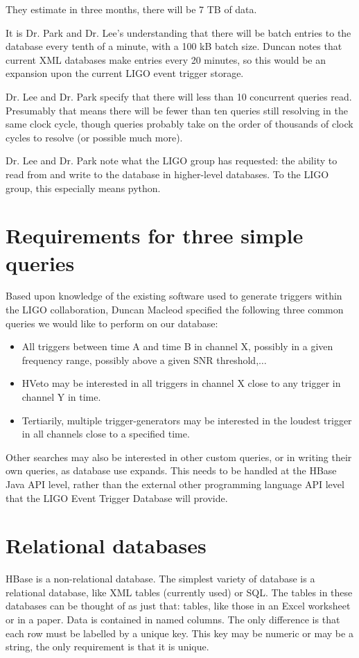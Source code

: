 \documentclass{article}
\begin{document}
They estimate in three months, there will be 7 TB of data.

It is Dr. Park and Dr. Lee's understanding that there will be batch
entries to the database every tenth of a minute, with a 100 kB batch
size. Duncan notes that current XML databases make entries every 20
minutes, so this would be an expansion upon the current LIGO event
trigger storage.

Dr. Lee and Dr. Park specify that there will less than 10 concurrent
queries read. Presumably that means there will be fewer than ten
queries still resolving in the same clock cycle, though queries
probably take on the order of thousands of clock cycles to resolve (or
possible much more).

Dr. Lee and Dr. Park note what the LIGO group has requested: the
ability to read from and write to the database in higher-level
databases. To the LIGO group, this especially means python.


\section{Requirements for three simple queries}
Based upon knowledge of the existing software used to generate
triggers within the LIGO collaboration, Duncan Macleod specified the
following three common queries we would like to perform on our
database:
\begin{itemize}
\item All triggers between time A and time B in channel X, possibly in a given frequency range, possibly above a given SNR threshold,$\ldots$
\item HVeto may be interested in all triggers in channel X close to any trigger in channel Y in time.
\item Tertiarily, multiple trigger-generators may be interested in the loudest
  trigger in all channels close to a specified time.
\end{itemize}

Other searches may also be interested in other custom queries, or in
writing their own queries, as database use expands. This needs to be
handled at the HBase Java API level, rather than the external other
programming language API level that the LIGO Event Trigger Database
will provide.


\section{Relational databases}
HBase is a non-relational database. The simplest variety of database
is a relational database, like XML tables (currently used) or SQL. The
tables in these databases can be thought of as just that: tables, like
those in an Excel worksheet or in a paper. Data is contained in named
columns. The only difference is that each row must be labelled by a
unique key. This key may be numeric or may be a string, the only
requirement is that it is unique.
\end{document}
